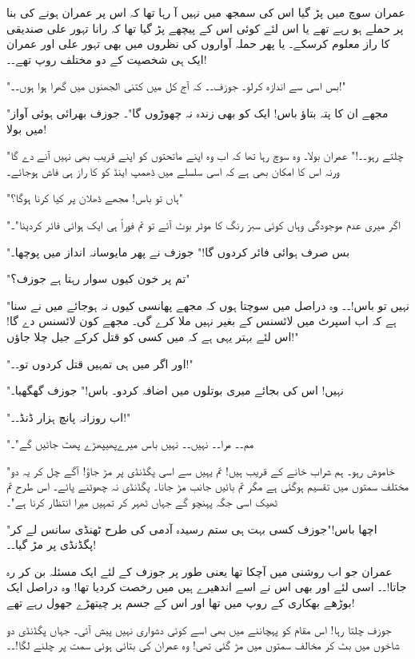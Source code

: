 عمران سوچ میں پڑ گیا اس کی سمجھ میں نہیں آ رہا تھا کہ اس پر عمران ہونے کی بنا پر حملے ہو رہے تھے یا اس لئے کوئی اس کے پیچھے پڑ گیا تھا کہ رانا تہور علی صندیقی کا راز معلوم کرسکے۔ یا پھر حملہ آواروں کی نظروں میں بھی تہور علی اور عمران ایک ہی شخصیت کے دو مختلف روپ تھے۔۔!

"بس اسی سے اندازہ کرلو۔ جوزف۔۔ کہ آج کل میں کتنی الجھنوں میں گھرا ہوا ہوں۔۔!"

"مجھے ان کا پتہ بتاؤ باس! ایک کو بھی زندہ نہ چھوڑوں گا"۔ جوزف بھرائی ہوئی آواز میں بولا!

"چلتے رہو۔۔!" عمران بولا۔ وہ سوچ رہا تھا کہ اب وہ اپنے ماتحتوں کو اپنے قریب بھی نہیں آنے دے گا ورنہ اس کا امکان بھی ہے کہ اسی سلسلے میں ڈھمپ اینڈ کو کا راز ہی فاش ہوجائے۔

"ہاں تو باس! مجھے ڈھلان پر کیا کرنا ہوگا؟"

"اگر میری عدم موجودگی وہاں کوئی سبز رنگ کا موٹر بوٹ آئے تو تم فوراً ہی ایک ہوائی فائر کردینا"۔

"بس صرف ہوائی فائر کردوں گا!" جوزف نے پھر مایوسانہ انداز میں پوچھا۔

"تم پر خون کیوں سوار رہتا ہے جوزف؟"

"نہیں تو باس!۔۔ وہ دراصل میں سوچتا ہوں کہ مجھے پھانسی کیوں نہ ہوجائے میں نے سنا ہے کہ اب اسپرٹ میں لائسنس کے بغیر نہیں ملا کرے گی۔ مجھے کون لائسنس دے گا! اس لئے بہتر یہی ہے کہ میں کسی کو قتل کرکے جیل چلا جاؤں!"

"اور اگر میں ہی تمہیں قتل کردوں تو۔۔!"

"نہیں! اس کی بجائے میری بوتلوں میں اضافہ کردو۔ باس!" جوزف گھگھیا۔

"اب روزانہ پانچ ہزار ڈنڈ۔۔!"

"مم۔۔ مرا۔۔ نہیں۔۔ نہیں باس میرےپھیپھڑے پھٹ جائیں گے"۔

"خاموش رہو۔ ہم شراب خانے کے قریب ہیں! تم یہیں سے اسی پگڈنڈی پر مڑ جاؤ! آگے چل کر یہ دو مختلف سمتوں میں تقسیم ہوگئی ہے مگر تم بائیں جانب مڑ جانا۔ پگڈنڈی نہ چھوٹنے پائے۔ اس طرح تم ٹھیک اسی جگہ پہنچو گے جہاں ٹھہر کر تمہیں میرا انتظار کرنا ہے"۔

"اچھا باس!"جوزف کسی بہت ہی ستم رسیدہ آدمی کی طرح ٹھنڈی سانس لے کر پگڈنڈی پر مڑ گیا۔۔!

عمران جو اب روشنی میں آچکا تھا یعنی طور پر جوزف کے لئے ایک مسئلہ بن کر رہ جاتا!۔۔ اسی لئے اور بھی اس نے اسے اندھیرے ہیں میں رخصت کردیا تھا! وہ دراصل ایک بوڑھے بھکاری کے روپ میں تھا اور اس کے جسم پر چیتھڑے جھول رہے تھے!

جوزف چلتا رہا! اس مقام کو پہچاننے میں بھی اسے کوئی دشواری نہیں پیش آئی۔ جہاں پگڈنڈی دو شاخوں میں بٹ کر مخالف سمتوں میں مڑ گئی تھی! وہ عمران کی بتائی ہوئی سمت پر چلنے لگا!۔۔

